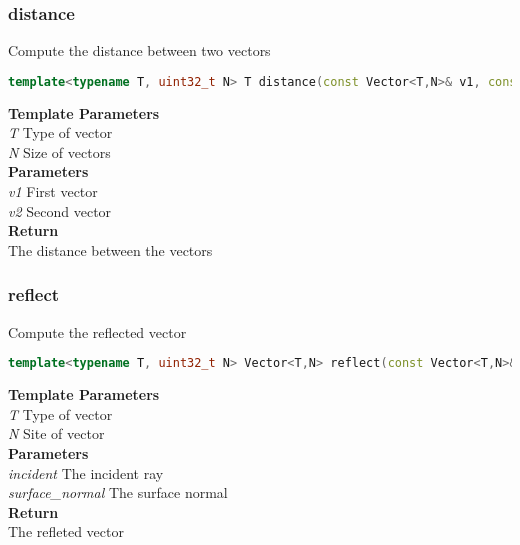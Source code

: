 \subsubsection{distance}
\begin{mdframed}
Compute the distance between two vectors
\begin{lstlisting}[language=C++]
template<typename T, uint32_t N> T distance(const Vector<T,N>& v1, const Vector<T,N>& v2) 
\end{lstlisting}
\textbf{Template Parameters} \\ 
\textit{T} Type of vector \\ 
\textit{N} Size of vectors \\ 
\textbf{Parameters} \\ 
\textit{v1} First vector \\ 
\textit{v2} Second vector \\ 
\textbf{Return} \\ 
The distance between the vectors\\ 
\end{mdframed}

\subsubsection{reflect}
\begin{mdframed}
Compute the reflected vector
\begin{lstlisting}[language=C++]
template<typename T, uint32_t N> Vector<T,N> reflect(const Vector<T,N>& incident, Vector<T,N> surface_normal) 
\end{lstlisting}
\textbf{Template Parameters} \\ 
\textit{T} Type of vector \\ 
\textit{N} Site of vector \\ 
\textbf{Parameters} \\ 
\textit{incident} The incident ray \\ 
\textit{surface\_normal} The surface normal \\ 
\textbf{Return} \\ 
The refleted vector\\ 
\end{mdframed}

